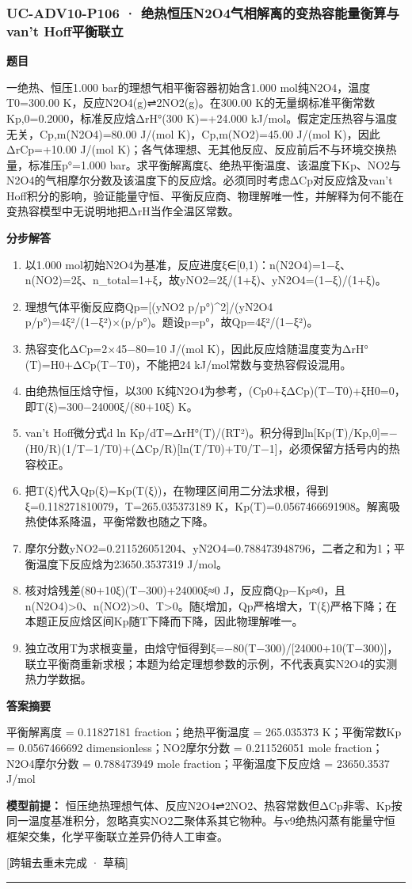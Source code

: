 \documentclass[UTF8,11pt,a4paper]{ctexart}
\begin{document}
\subsubsection*{UC-ADV10-P106 · 绝热恒压N2O4气相解离的变热容能量衡算与van’t Hoff平衡联立}
\noindent\textbf{题目}\par
一绝热、恒压1.000 bar的理想气相平衡容器初始含1.000 mol纯N2O4，温度T0=300.00 K，反应N2O4(g)⇌2NO2(g)。在300.00 K的无量纲标准平衡常数Kp,0=0.2000，标准反应焓ΔrH°(300 K)=+24.000 kJ/mol。假定定压热容与温度无关，Cp,m(N2O4)=80.00 J/(mol K)，Cp,m(NO2)=45.00 J/(mol K)，因此ΔrCp=+10.00 J/(mol K)；各气体理想、无其他反应、反应前后不与环境交换热量，标准压p°=1.000 bar。求平衡解离度ξ、绝热平衡温度、该温度下Kp、NO2与N2O4的气相摩尔分数及该温度下的反应焓。必须同时考虑ΔCp对反应焓及van’t Hoff积分的影响，验证能量守恒、平衡反应商、物理解唯一性，并解释为何不能在变热容模型中无说明地把ΔrH当作全温区常数。\par
\medskip\noindent\textbf{分步解答}
\begin{enumerate}
\item 以1.000 mol初始N2O4为基准，反应进度ξ∈[0,1)：n(N2O4)=1−ξ、n(NO2)=2ξ、n\_total=1+ξ，故yNO2=2ξ/(1+ξ)、yN2O4=(1−ξ)/(1+ξ)。
\item 理想气体平衡反应商Qp=[(yNO2 p/p°)\textasciicircum{}2]/(yN2O4 p/p°)=4ξ²/(1−ξ²)×(p/p°)。题设p=p°，故Qp=4ξ²/(1−ξ²)。
\item 热容变化ΔCp=2×45−80=10 J/(mol K)，因此反应焓随温度变为ΔrH°(T)=H0+ΔCp(T−T0)，不能把24 kJ/mol常数与变热容假设混用。
\item 由绝热恒压焓守恒，以300 K纯N2O4为参考，(Cp0+ξΔCp)(T−T0)+ξH0=0，即T(ξ)=300−24000ξ/(80+10ξ) K。
\item van’t Hoff微分式d ln Kp/dT=ΔrH°(T)/(RT²)。积分得到ln[Kp(T)/Kp,0]=−(H0/R)(1/T−1/T0)+(ΔCp/R)[ln(T/T0)+T0/T−1]，必须保留方括号内的热容校正。
\item 把T(ξ)代入Qp(ξ)=Kp(T(ξ))，在物理区间用二分法求根，得到ξ=0.118271810079，T=265.035373189 K，Kp(T)=0.0567466691908。解离吸热使体系降温，平衡常数也随之下降。
\item 摩尔分数yNO2=0.211526051204、yN2O4=0.788473948796，二者之和为1；平衡温度下反应焓为23650.3537319 J/mol。
\item 核对焓残差(80+10ξ)(T−300)+24000ξ≈0 J，反应商Qp−Kp≈0，且n(N2O4)>0、n(NO2)>0、T>0。随ξ增加，Qp严格增大，T(ξ)严格下降；在本题正反应焓区间Kp随T下降而下降，因此物理解唯一。
\item 独立改用T为求根变量，由焓守恒得到ξ=−80(T−300)/[24000+10(T−300)]，联立平衡商重新求根；本题为给定理想参数的示例，不代表真实N2O4的实测热力学数据。
\end{enumerate}
\noindent\textbf{答案摘要}\par
平衡解离度 = 0.11827181 fraction；绝热平衡温度 = 265.035373 K；平衡常数Kp = 0.0567466692 dimensionless；NO2摩尔分数 = 0.211526051 mole fraction；N2O4摩尔分数 = 0.788473949 mole fraction；平衡温度下反应焓 = 23650.3537 J/mol\par
\noindent\textbf{模型前提：}
恒压绝热理想气体、反应N2O4⇌2NO2、热容常数但ΔCp非零、Kp按同一温度基准积分，忽略真实NO2二聚体系其它物种。与v9绝热闪蒸有能量守恒框架交集，化学平衡联立差异仍待人工审查。\par
\noindent\textcolor{red!65!black}{[跨辑去重未完成 · 草稿]} \par
\medskip\hrule\medskip
{}
\end{document}
